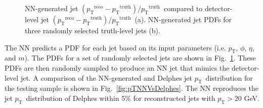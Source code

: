 \documentclass[showpacs,showkeys,preprint,prd,nofootinbib,linenumbers,12pt,superscriptaddress]{revtex4-1}
\def\pt{\ensuremath{p_{\mathrm{T}}}}
\def\ptRes{\ensuremath{(\pt^{\mathrm{reco}}-\pt^{\mathrm{truth}})/\pt^{\mathrm{truth}}}}
\begin{document}
\begin{figure}[htb]
  \caption{NN-generated jet \ptRes\ compared to detector-level jet \ptRes\ (a). NN-generated jet PDFs for three randomly selected truth-level jets (b).}
  \label{fig:PDFComp}
\end{figure}

The NN predicts a PDF for each jet based on its input parameters (i.e. \pt, $\phi$, $\eta$, and $m$). The PDFs for a set of randomly selected jets are shown in Fig.~\ref{fig:PDFComp}. These PDFs are then randomly sampled to produce an NN jet that mimics the detector-level jet. A comparison of the NN-generated and Delphes jet \pt\ distribution for the testing sample is shown in Fig.~\ref{fig:pTNNVsDelphes}. The NN reproduces the jet \pt\ distribution of Delphes within 5\% for reconstructed jets with $\pt>20$ GeV. 
\end{document}
